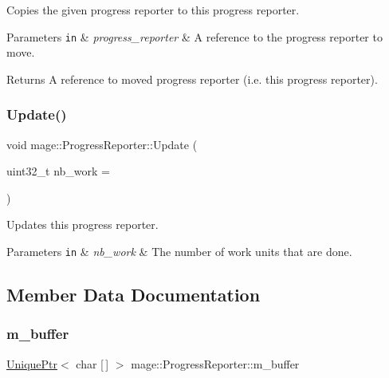 Copies the given progress reporter to this progress reporter.


\begin{DoxyParams}[1]{Parameters}
\mbox{\tt in}  & {\em progress\+\_\+reporter} & A reference to the progress reporter to move. \\
\hline
\end{DoxyParams}
\begin{DoxyReturn}{Returns}
A reference to moved progress reporter (i.\+e. this progress reporter). 
\end{DoxyReturn}
\hypertarget{classmage_1_1_progress_reporter_a0a5f99f15e4152da9a3d6aadd888244a}{}\label{classmage_1_1_progress_reporter_a0a5f99f15e4152da9a3d6aadd888244a} 
\subsubsection{\texorpdfstring{Update()}{Update()}}
{\footnotesize\ttfamily void mage\+::\+Progress\+Reporter\+::\+Update (\begin{DoxyParamCaption}\item[{uint32\+\_\+t}]{nb\+\_\+work = {} }\end{DoxyParamCaption})}

Updates this progress reporter.


\begin{DoxyParams}[1]{Parameters}
\mbox{\tt in}  & {\em nb\+\_\+work} & The number of work units that are done. \\
\hline
\end{DoxyParams}


\subsection{Member Data Documentation}
\hypertarget{classmage_1_1_progress_reporter_a725763db34f5bbb7408107d55ee43beb}{}\label{classmage_1_1_progress_reporter_a725763db34f5bbb7408107d55ee43beb} 
\subsubsection{\texorpdfstring{m\+\_\+buffer}{m\_buffer}}
{\footnotesize\ttfamily \hyperlink{namespacemage_a3316d7143a973e37adf1110f2e80ca31}{Unique\+Ptr}$<$ char \mbox{[}$\,$\mbox{]} $>$ mage\+::\+Progress\+Reporter\+::m\+\_\+buffer\hspace{0.3cm}{\ttfamily [private]}}

